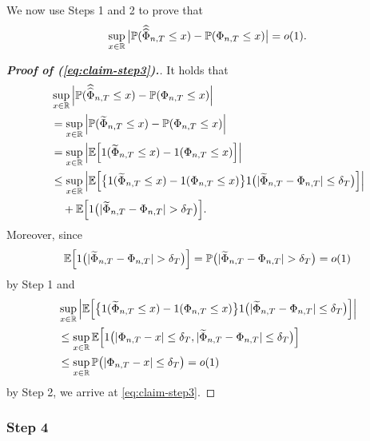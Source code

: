 We now use Steps 1 and 2 to prove that 
\begin{equation}\label{eq:claim-step3}
\sup_{x \in \mathbb{R}} \big| \mathbb{P}(\widehat{\widehat{\Phi}}_{n, T} \le x) - \mathbb{P}(\Phi_{n,T} \le x) \big| = o(1). 
\end{equation}
\begin{proof}[\textnormal{\textbf{Proof of (\ref{eq:claim-step3}).}}]
It holds that
\begin{align*}
 & \sup_{x \in \mathbb{R}} \Big| \mathbb{P}(\widehat{\widehat{\Phi}}_{n, T} \le x) - \mathbb{P}(\Phi_{n,T} \le x) \Big| \\
 & = \sup_{x \in \mathbb{R}} \Big| \mathbb{P}(\widetilde{\Phi}_{n, T} \le x) - \mathbb{P}(\Phi_{n,T} \le x) \Big| \\
 & = \sup_{x \in \mathbb{R}} \Big| \mathbb{E} \Big[ 1(\widetilde{\Phi}_{n, T} \le x) - 1 (\Phi_{n,T} \le x) \Big] \Big| \\
 & \le \sup_{x \in \mathbb{R}} \Big| \mathbb{E} \Big[ \big\{ 1(\widetilde{\Phi}_{n, T} \le x) - 1 (\Phi_{n,T} \le x) \big\} 1 \big( |\widetilde{\Phi}_{n, T} - \Phi_{n,T}| \le \delta_T \big) \Big] \Big| \\
 & \quad + \mathbb{E} \Big[ 1 \big( |\widetilde{\Phi}_{n, T} - \Phi_{n,T}| > \delta_T \big) \Big].
\end{align*} 
Moreover, since  
\[ \mathbb{E} \Big[ 1 \big( |\widetilde{\Phi}_{n, T} - \Phi_{n,T}| > \delta_T \big) \Big] = \mathbb{P}  \big( |\widetilde{\Phi}_{n, T} - \Phi_{n,T}| > \delta_T \big) = o(1) \]
by Step 1 and 
\begin{align*}
 & \sup_{x \in \mathbb{R}} \Big| \mathbb{E} \Big[ \big\{ 1(\widetilde{\Phi}_{n, T} \le x) - 1 (\Phi_{n,T} \le x) \big\} 1 \big( |\widetilde{\Phi}_{n, T} - \Phi_{n,T}| \le \delta_T \big) \Big] \Big| \\
 & \le \sup_{x \in \mathbb{R}} \mathbb{E} \Big[ 1 \big( |\Phi_{n, T} - x| \le \delta_T, |\widetilde{\Phi}_{n, T} - \Phi_{n,T}| \le \delta_T \big) \Big] \\
 & \le \sup_{x \in \mathbb{R}} \mathbb{P} \big( |\Phi_{n, T} - x| \le \delta_T \big) = o(1)
\end{align*}
by Step 2, we arrive at \eqref{eq:claim-step3}.
\end{proof}


\subsubsection*{Step 4}


